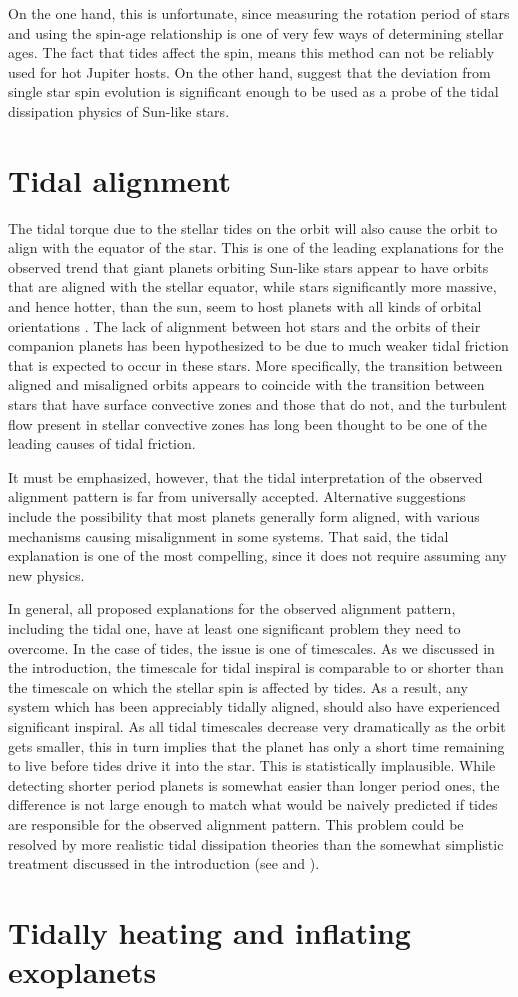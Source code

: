 On the one hand, this is unfortunate, since measuring the rotation period of
stars and using the spin-age relationship is one of very few ways of determining
stellar ages. The fact that tides affect the spin, means this method can not be
reliably used for hot Jupiter hosts. On the other hand, \citet{Penev_et_al_18}
suggest that the deviation from single star spin evolution is significant enough
to be used as a probe of the tidal dissipation physics of Sun-like stars.

\section{Tidal alignment}

The tidal torque due to the stellar tides on the orbit will also cause the orbit
to align with the equator of the star. This is one of the leading explanations
for the observed trend that giant planets orbiting Sun-like stars appear to
have orbits that are aligned with the stellar equator, while stars significantly
more massive, and hence hotter, than the sun, seem to host planets with all
kinds of orbital orientations \citep[c.f. chapter 5.2 of][]{Winn_Fabrycky_2015}.
The lack of alignment between hot stars and the orbits of their companion
planets has been hypothesized to be due to much weaker tidal friction that is
expected to occur in these stars. More specifically, the transition between
aligned and misaligned orbits appears to coincide with the transition between
stars that have surface convective zones and those that do not, and the
turbulent flow present in stellar convective zones has long been thought to be
one of the leading causes of tidal friction.

It must be emphasized, however, that the tidal interpretation of the observed
alignment pattern is far from universally accepted.  Alternative suggestions
include the possibility that most planets generally form aligned, with various
mechanisms causing misalignment in some systems. That said, the tidal
explanation is one of the most compelling, since it does not require assuming
any new physics.

In general, all proposed explanations for the observed alignment pattern,
including the tidal one, have at least one significant problem they need to
overcome. In the case of tides, the issue is one of timescales. As we discussed
in the introduction, the timescale for tidal inspiral is comparable to or
shorter than the timescale on which the stellar spin is affected by tides. As a
result, any system which has been appreciably tidally aligned, should also have
experienced significant inspiral. As all tidal timescales decrease very
dramatically as the orbit gets smaller, this in turn implies that the planet has
only a short time remaining to live before tides drive it into the star. This is
statistically implausible. While detecting shorter period planets is somewhat
easier than longer period ones, the difference is not large enough to match what
would be naively predicted if tides are responsible for the observed alignment
pattern. This problem could be resolved by more realistic tidal dissipation
theories than the somewhat simplistic treatment discussed in the introduction
(see \citep{Lai_12} and \citep{Anderson_et_al_21}).

\section{Tidally heating and inflating exoplanets}
